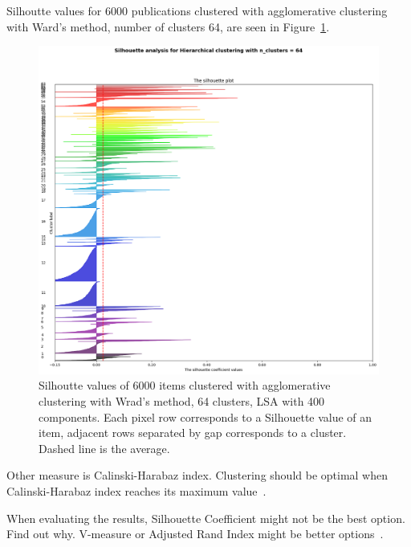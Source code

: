 Silhoutte values for 6000 publications clustered with 
agglomerative clustering with Ward's method, number of clusters 
64, are seen in Figure~\ref{fig:silh01}.
\begin{figure}[ht]
  \begin{center}    
\includegraphics[width=13cm]{images/6000-64-400-Hierarchical-silhouette-plot.png}
    \caption{Silhoutte values of 6000 items clustered with 
    agglomerative clustering with Wrad's method, 64 clusters, 
    LSA with 400 components. Each pixel row corresponds to a 
    Silhouette value of an item, adjacent rows separated by gap 
    corresponds to a cluster.
    Dashed line is the average.}
    \label{fig:silh01}
  \end{center}
\end{figure}

Other measure is Calinski-Harabaz index. Clustering should be 
optimal when Calinski-Harabaz index reaches its maximum
value~\cite{}.

When evaluating the results, Silhouette Coefficient might not be
the best option. Find out why. V-measure or Adjusted Rand Index
might be better options~\cite{noauthor_clustering_nodate}.


